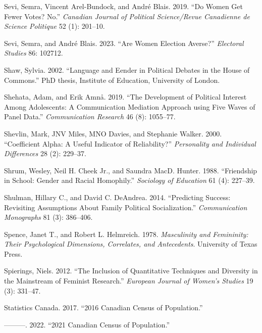 \documentclass[
  letterpaper,
  DIV=11,
  numbers=noendperiod]{scrreprt}
\newlength{\cslhangindent}
\newenvironment{CSLReferences}[2] %
 {\begin{list}{}{%
  \setlength{\itemindent}{0pt}
  \setlength{\leftmargin}{0pt}
  \setlength{\parsep}{0pt}
  \ifodd #1
   \setlength{\leftmargin}{\cslhangindent}
   \setlength{\itemindent}{-1\cslhangindent}
  \fi
  \setlength{\itemsep}{#2\baselineskip}}}
 {\end{list}}
\begin{document}
\begin{CSLReferences}{1}{0}
Sevi, Semra, Vincent Arel-Bundock, and André Blais. 2019. {``{Do Women
Get Fewer Votes? No.}''} \emph{Canadian Journal of Political
Science/Revue Canadienne de Science Politique} 52 (1): 201--10.

Sevi, Semra, and André Blais. 2023. {``{Are Women Election Averse?}''}
\emph{Electoral Studies} 86: 102712.

Shaw, Sylvia. 2002. {``{Language and Eender in Political Debates in the
House of Commons}.''} PhD thesis, Institute of Education, University of
London.

Shehata, Adam, and Erik Amnå. 2019. {``{The Development of Political
Interest Among Adolescents: A Communication Mediation Approach using
Five Waves of Panel Data}.''} \emph{Communication Research} 46 (8):
1055--77.

Shevlin, Mark, JNV Miles, MNO Davies, and Stephanie Walker. 2000.
{``{Coefficient Alpha: A Useful Indicator of Reliability?}''}
\emph{Personality and Individual Differences} 28 (2): 229--37.

Shrum, Wesley, Neil H. Cheek Jr., and Saundra MacD. Hunter. 1988.
{``{Friendship in School: Gender and Racial Homophily}.''}
\emph{Sociology of Education} 61 (4): 227--39.

Shulman, Hillary C., and David C. DeAndrea. 2014. {``{Predicting
Success: Revisiting Assumptions About Family Political
Socialization}.''} \emph{Communication Monographs} 81 (3): 386--406.

Spence, Janet T., and Robert L. Helmreich. 1978. \emph{{Masculinity and
Femininity: Their Psychological Dimensions, Correlates, and
Antecedents}}. University of Texas Press.

Spierings, Niels. 2012. {``{The Inclusion of Quantitative Techniques and
Diversity in the Mainstream of Feminist Research}.''} \emph{European
Journal of Women's Studies} 19 (3): 331--47.

Statistics Canada. 2017. {``{2016 Canadian Census of Population}.''}

---------. 2022. {``{2021 Canadian Census of Population}.''}


\end{CSLReferences}
\end{document}
